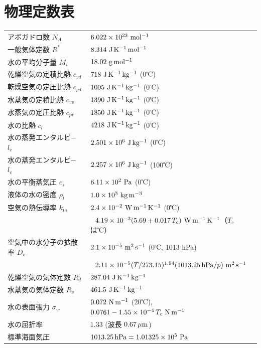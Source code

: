 \documentclass{ltjsarticle}
\begin{document}
\section{物理定数表}
\begin{table}[h]
 \begin{tabular}{ll}
 アボガドロ数 $N_{A}$ & $6.022 \times 10^{23} \ \rm{mol^{-1}}$ \\
 一般気体定数 $R^{*}$ & $8.314 \ \rm{J\,K^{-1}\,mol^{-1}}$ \\
 水の平均分子量 $M_{v}$ & $18.02 \ \rm{g\,mol^{-1}}$ \\ 
 乾燥空気の定積比熱 $c_{vd}$ & $718 \ \rm{J\,K^{-1}\,kg^{-1}}$ (0℃) \\ 
 乾燥空気の定圧比熱 $c_{pd}$ & $1005 \ \rm{J\,K^{-1}\,kg^{-1}}$ (0℃) \\
 水蒸気の定積比熱 $c_{vv}$ & $1390 \ \rm{J\,K^{-1}\,kg^{-1}}$ (0℃) \\ 
 水蒸気の定圧比熱 $c_{pv}$ & $1850 \ \rm{J\,K^{-1}\,kg^{-1}}$ (0℃) \\
 水の比熱 $c_{l}$ & $4218 \ \rm{J\,K^{-1}\,kg^{-1}}$ (0℃) \\
 水の蒸発エンタルピ− $l_{v}$ & $2.501 \times 10^{6} \ \rm{J \,kg^{-1}}$ (0℃) \\
 水の蒸発エンタルピ− $l_{v}$ & $2.257 \times 10^{6} \ \rm{J \,kg^{-1}}$ (100℃) \\
 水の平衡蒸気圧 $e_{s}$ & $6.11 \times 10^{2} \ \rm{Pa}$ (0℃) \\
 液体の水の密度 $\rho_{l}$ & $1.0 \times 10^{3} \ \rm{kg\,m^{-3}}$  \\
 空気の熱伝導率 $k_{ta}$ & $2.4 \times 10^{-2} \ \rm{W\,m^{-1}\,K^{-1}}$  (0℃)\\
  & $\ \ 4.19\times10^{-3}(5.69+0.017\,T_{c})\ \rm{W\,m^{-1}\,K^{-1}}$（$T_{c}$は℃）\\
 空気中の水分子の拡散率 $D_{v}$ & $2.1 \times 10^{-5} \ \rm{m^{2}\,s^{-1}}$  (0℃, 1013 hPa)\\
  & $\ \ 2.11\times10^{-5}(T/273.15)^{1.94}(1013.25\,{\rm hPa}/p)\ \rm{m^{2}\,s^{-1}}$\\
 乾燥空気の気体定数 $R_{d}$ & $287.04 \ \rm{J\,K^{-1}\,kg^{-1}}$ \\
 水蒸気の気体定数 $R_{v}$ & $461.5 \ \rm{J\,K^{-1}\,kg^{-1}}$ \\
 水の表面張力 $\sigma_{w}$ & $0.072 \ \rm{N\,m^{-1}}$ (20℃),\ \ $0.0761-1.55\times10^{-4}\,T_{c}\ \rm{N\,m^{-1}}$ \\
 水の屈折率 & $1.33$ (波長 $0.67\,\rm \mu m$) \\
 標準海面気圧 & $1013.25\,\rm{hPa} = 1.01325 \times 10^{5}\ \rm{Pa}$
 \end{tabular}
\end{table}
\end{document}
